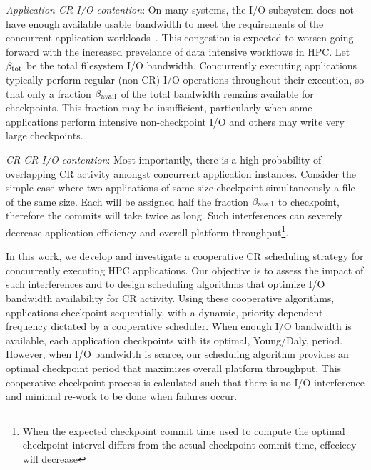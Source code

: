 \begin{compactitem}
        
\item \emph{Application-CR I/O contention}: On many systems, the I/O subsystem
does not have enough available usable bandwidth to meet the requirements of the
concurrent application workloads~\cite{Luu:2015:Multiplatform}. This congestion
is expected to worsen going forward with the increased prevelance of data
intensive workflows in HPC.  Let $\beta_{\text{tot}}$ be the total filesystem I/O
bandwidth.  Concurrently executing applications typically perform regular
(non-CR) I/O operations throughout their execution, so that only a fraction
$\beta_{\text{avail}}$ of the total bandwidth remains available for checkpoints.  This
fraction may be insufficient, particularly when some applications perform
intensive non-checkpoint I/O and others may write very large checkpoints.

\item \emph{CR-CR I/O contention}: Most importantly, there is a high
probability of overlapping CR activity amongst concurrent application
instances.  Consider the simple case where two applications of same size
checkpoint simultaneously a file of the same size. Each will be assigned half
the fraction $\beta_{\text{avail}}$ to checkpoint, therefore the commits will take twice
as long. Such interferences can severely decrease application efficiency and
overall platform throughput\footnote{When the expected checkpoint commit time
used to compute the optimal checkpoint interval differs from the actual
checkpoint commit time, effeciecy will decrease}.

\end{compactitem}

In this work, we develop and investigate a cooperative CR scheduling strategy
for concurrently executing HPC applications.  Our objective is to assess the
impact of such interferences and to design scheduling algorithms that optimize
I/O bandwidth availability for CR activity.  Using these cooperative
algorithms, applications checkpoint sequentially, with a dynamic,
priority-dependent frequency dictated by a cooperative scheduler.  When enough
I/O bandwidth is available, each application checkpoints with its optimal,
Young/Daly, period.  However, when I/O bandwidth is scarce, our scheduling
algorithm provides an optimal checkpoint period that maximizes overall platform
throughput. This cooperative checkpoint process is calculated such that there
is no I/O interference and minimal re-work to be done when failures occur.


